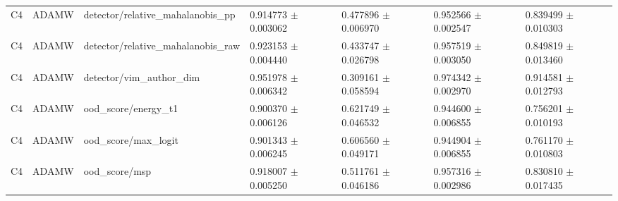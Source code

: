 \begin{longtable}{lllllll}
C4 & ADAMW & detector/relative\_mahalanobis\_pp & 0.914773 $\pm$ 0.003062 & 0.477896 $\pm$ 0.006970 & 0.952566 $\pm$ 0.002547 & 0.839499 $\pm$ 0.010303 \\
C4 & ADAMW & detector/relative\_mahalanobis\_raw & 0.923153 $\pm$ 0.004440 & 0.433747 $\pm$ 0.026798 & 0.957519 $\pm$ 0.003050 & 0.849819 $\pm$ 0.013460 \\
C4 & ADAMW & detector/vim\_author\_dim & 0.951978 $\pm$ 0.006342 & 0.309161 $\pm$ 0.058594 & 0.974342 $\pm$ 0.002970 & 0.914581 $\pm$ 0.012793 \\
C4 & ADAMW & ood\_score/energy\_t1 & 0.900370 $\pm$ 0.006126 & 0.621749 $\pm$ 0.046532 & 0.944600 $\pm$ 0.006855 & 0.756201 $\pm$ 0.010193 \\
C4 & ADAMW & ood\_score/max\_logit & 0.901343 $\pm$ 0.006245 & 0.606560 $\pm$ 0.049171 & 0.944904 $\pm$ 0.006855 & 0.761170 $\pm$ 0.010803 \\
C4 & ADAMW & ood\_score/msp & 0.918007 $\pm$ 0.005250 & 0.511761 $\pm$ 0.046186 & 0.957316 $\pm$ 0.002986 & 0.830810 $\pm$ 0.017435 \\
\end{longtable}
